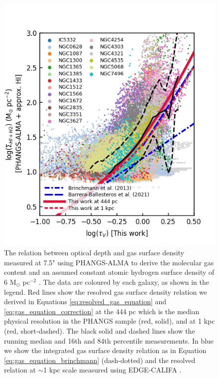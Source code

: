 \documentclass[fleqn,usenatbib]{mnras}
\begin{document}
\begin{figure}
    \centering
    \includegraphics[width=\columnwidth]{figures/fig8.png}
    \caption{The relation between optical depth and gas surface density measured at 7.5" using PHANGS-ALMA to derive the molecular gas content and an assumed constant atomic hydrogen surface density of 6 M$_{\odot}$ pc$^{-2}$ \citep{leroy2021}. The data are coloured by each galaxy, as shown in the legend. Red lines show the resolved gas surface density relation we derived in Equations \ref{eq:resolved_gas_equation} and \ref{eq:gas_equation_correction} at the 444 pc which is the median physical resolution in the PHANGS sample (red, solid),  and at 1 kpc (red, short-dashed). The black solid and dashed lines show the running median and 16th and 84th percentile measurements. In blue we show the integrated gas surface density relation as in Equation \ref{eq:gas_equation_brinchmann} \citep{brinchmann2013} (dash-dotted) and the resolved relation at $\sim$1 kpc scale measured using EDGE-CALIFA \citep{barrera-ballesteros2021}.}
    \label{fig:MUSE_optical_depth_comparison_PHANGS_ALMA}
\end{figure}
\end{document}
